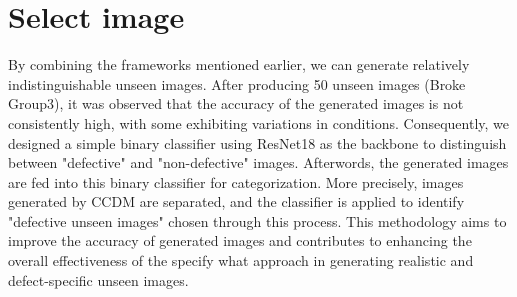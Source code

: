 \section{Select image}
By combining the frameworks mentioned earlier, we can generate relatively indistinguishable unseen images. After producing 50 unseen images (Broke Group3), it was observed that the accuracy of the generated images is not consistently high, with some exhibiting variations in conditions. Consequently, we designed a simple binary classifier using ResNet18 as the backbone to distinguish between "defective" and "non-defective" images. Afterwords, the generated images are fed into this binary classifier for categorization. More precisely, images generated by CCDM are separated, and the classifier is applied to identify "defective unseen images" chosen through this process. This methodology aims to improve the accuracy of generated images and contributes to enhancing the overall effectiveness of the specify what approach in generating realistic and defect-specific unseen images.


